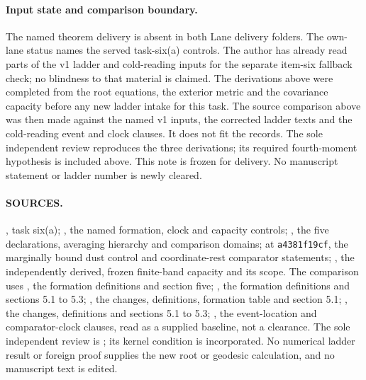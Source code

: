 \documentclass[11pt]{article}
\begin{document}
\paragraph{Input state and comparison boundary.}
The named theorem delivery is absent in both Lane delivery folders.
The own-lane status names the served task-six(a) controls. The author
has already read parts of the v1 ladder and cold-reading inputs for
the separate item-six fallback check; no blindness to that material
is claimed. The derivations above were completed from the root
equations, the exterior metric and the covariance capacity before
any new ladder intake for this task. The source comparison above was
then made against the named v1 inputs, the corrected ladder texts and
the cold-reading event and clock clauses. It does not fit the records.
The sole independent review reproduces the three derivations; its
required fourth-moment hypothesis is included above. This note is
frozen for delivery. No manuscript statement or ladder number is
newly cleared.

\paragraph{SOURCES.}
,
task six(a);
,
the named formation, clock and capacity controls;
,
the five declarations, averaging hierarchy and comparison domains;
at \texttt{a4381f19cf}, the marginally bound dust control and
coordinate-rest comparator statements;
,
the independently derived, frozen finite-band capacity and its scope.
The comparison uses
,
the formation definitions and section five;
,
the formation definitions and sections 5.1 to 5.3;
,
the changes, definitions, formation table and section 5.1;
,
the changes, definitions and sections 5.1 to 5.3;
,
the event-location and comparator-clock clauses, read as a supplied
baseline, not a clearance.
The sole independent review is
;
its kernel condition is incorporated.
No numerical ladder result or foreign proof supplies the new root
or geodesic calculation, and no manuscript text is edited.
\end{document}
